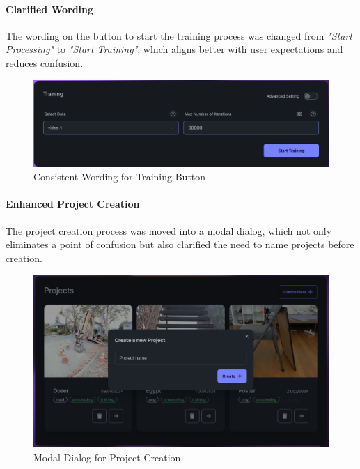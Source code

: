 \paragraph{Clarified Wording}
The wording on the button to start the training process was changed from \emph{"Start Processing"} to \emph{"Start Training"}, which aligns better with user expectations and reduces confusion. 

\begin{figure}[htb]
	\includegraphics[width=\textwidth]{figures/fix-2.png}
	\caption{Consistent Wording for Training Button}
  \label{fig:fix-2}
\end{figure}

\paragraph{Enhanced Project Creation}
The project creation process was moved into a modal dialog, which not only eliminates a point of confusion but also clarified the need to name projects before creation. 

\begin{figure}[htb]
	\includegraphics[width=\textwidth]{figures/fix-3.png}
	\caption{Modal Dialog for Project Creation}
  \label{fig:fix-3}
\end{figure}

